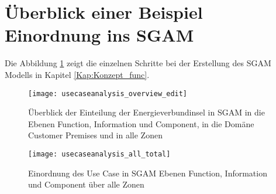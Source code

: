	\section{Überblick einer Beispiel Einordnung ins SGAM }
		Die Abbildung \ref{Abb:SGAM_map_overview} zeigt die einzelnen Schritte bei der Erstellung des SGAM Modells in Kapitel \ref{Kap:Konzept_func}.
		\begin{figure}[h] 
			\centering
			\texttt{[image: usecaseanalysis\_overview\_edit]}
			\caption{Überblick der Einteilung der Energieverbundinsel in SGAM in die Ebenen Function, Information und Component, in die Domäne Customer Premises und in alle Zonen}
			\label{Abb:SGAM_map_overview}
		\end{figure} 	
        
    \begin{landscape}
        \begin{figure}[h] %
            \centering
            \texttt{[image: usecaseanalysis\_all\_total]}
            \caption{Einordnung des Use Case in SGAM Ebenen Function, Information und Component über alle Zonen}
            \label{Abb:SGAM_map_all_total_big}
        \end{figure} 
	\end{landscape}